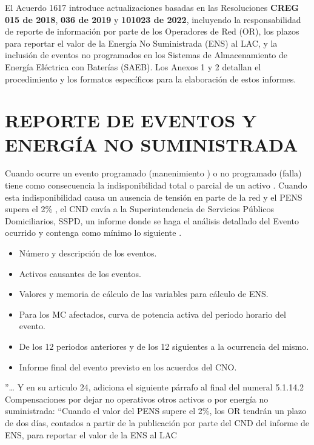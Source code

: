 \documentclass[a5paper]{book}%
\begin{document}
El Acuerdo 1617 introduce actualizaciones basadas en las Resoluciones \textbf{CREG 015 de 2018}, \textbf{036 de 2019} y \textbf{101023 de 2022}, incluyendo la responsabilidad de reporte de información por parte de los Operadores de Red (OR), los plazos para reportar el valor de la Energía No Suministrada (ENS) al LAC, y la inclusión de eventos no programados en los Sistemas de Almacenamiento de Energía Eléctrica con Baterías (SAEB). Los Anexos 1 y 2 detallan el procedimiento y los formatos específicos para la elaboración de estos informes.

\section{REPORTE DE EVENTOS Y ENERGÍA NO SUMINISTRADA}

Cuando ocurre un evento programado (manenimiento ) o no programado (falla)  tiene como consecuencia la  indisponibilidad total o parcial  de un activo \cite{CREG0942012}. Cuando esta indisponibilidad causa un ausencia de tensión  en parte de la red y el \ac{PENS} supera el 2\% ,  el \ac{CND} envía a la Superintendencia de Servicios Públicos Domiciliarios, SSPD, un informe donde se haga el análisis detallado del Evento ocurrido y contenga como mínimo lo siguiente \cite{CREG0152018}.


 \begin{itemize}
 \item Número y descripción de los eventos.
 \item Activos causantes de los eventos.
 \item Valores y memoria de cálculo de las variables para cálculo de ENS.
 \item Para los MC afectados, curva de potencia activa del periodo horario del evento.
 \item De los 12 periodos anteriores y de los 12 siguientes a la ocurrencia del mismo.
 \item Informe final del evento previsto en los acuerdos del CNO.
 \end{itemize}


 ”… Y en su articulo 24, adiciona el siguiente párrafo al final del numeral 5.1.14.2 Compensaciones por dejar no operativos otros activos o por energía no suministrada: “Cuando el valor del PENS supere el 2\%, los OR tendrán un plazo de dos días, contados a partir de la publicación por parte del CND del informe de ENS, para reportar el valor de la ENS al LAC
 
\end{document}
